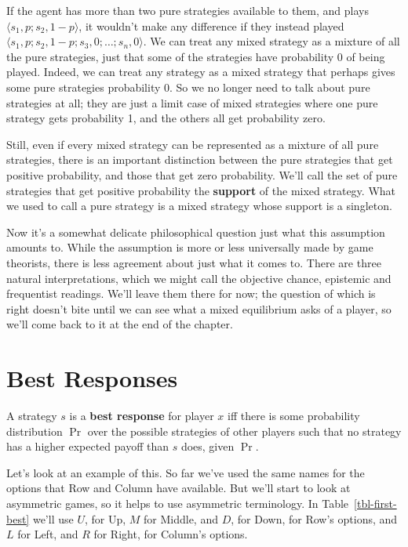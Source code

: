 \documentclass[
  11pt,
  letterpaper,
]{scrbook}
\begin{document}
If the agent has more than two pure strategies available to them, and
plays \(\langle s_1, p; s_2, 1-p \rangle\), it wouldn't make any
difference if they instead played
\(\langle s_1, p; s_2, 1-p; s_3, 0; \dots; s_n, 0\rangle\). We can treat
any mixed strategy as a mixture of all the pure strategies, just that
some of the strategies have probability 0 of being played. Indeed, we
can treat any strategy as a mixed strategy that perhaps gives some pure
strategies probability 0. So we no longer need to talk about pure
strategies at all; they are just a limit case of mixed strategies where
one pure strategy gets probability 1, and the others all get probability
zero.

Still, even if every mixed strategy can be represented as a mixture of
all pure strategies, there is an important distinction between the pure
strategies that get positive probability, and those that get zero
probability. We'll call the set of pure strategies that get positive
probability the \textbf{support} of the mixed strategy. What we used to
call a pure strategy is a mixed strategy whose support is a singleton.

Now it's a somewhat delicate philosophical question just what this
assumption amounts to. While the assumption is more or less universally
made by game theorists, there is less agreement about just what it comes
to. There are three natural interpretations, which we might call the
objective chance, epistemic and frequentist readings. We'll leave them
there for now; the question of which is right doesn't bite until we can
see what a mixed equilibrium asks of a player, so we'll come back to it
at the end of the chapter.

\section{Best Responses}\label{sec-best-responses}

A strategy \(s\) is a \textbf{best response} for player \(x\) iff there
is some probability distribution \(\Pr\) over the possible strategies of
other players such that no strategy has a higher expected payoff than
\(s\) does, given \(\Pr\).

Let's look at an example of this. So far we've used the same names for
the options that Row and Column have available. But we'll start to look
at asymmetric games, so it helps to use asymmetric terminology. In
Table~\ref{tbl-first-best} we'll use \(U\), for Up, \(M\) for Middle,
and \(D\), for Down, for Row's options, and \(L\) for Left, and \(R\)
for Right, for Column's options.
\end{document}
